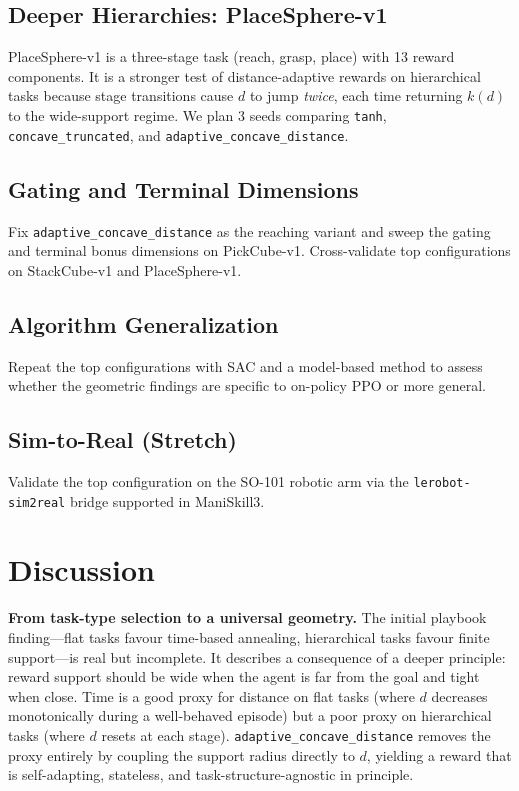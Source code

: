 \documentclass{article}
\begin{document}
\subsection{Deeper Hierarchies: PlaceSphere-v1}

PlaceSphere-v1 is a three-stage task (reach, grasp, place) with 13 reward components.
It is a stronger test of distance-adaptive rewards on hierarchical tasks because stage
transitions cause $d$ to jump \emph{twice}, each time returning $k(d)$ to the
wide-support regime. We plan 3 seeds comparing \texttt{tanh}, \texttt{concave\_truncated},
and \texttt{adaptive\_concave\_distance}.

\subsection{Gating and Terminal Dimensions}

Fix \texttt{adaptive\_concave\_distance} as the reaching variant and sweep the gating
and terminal bonus dimensions on PickCube-v1. Cross-validate top configurations on
StackCube-v1 and PlaceSphere-v1.

\subsection{Algorithm Generalization}

Repeat the top configurations with SAC and a model-based method to assess whether
the geometric findings are specific to on-policy PPO or more general.

\subsection{Sim-to-Real (Stretch)}

Validate the top configuration on the SO-101 robotic arm via the
\texttt{lerobot-sim2real} bridge supported in ManiSkill3.

\section{Discussion}
\label{sec:discussion}

\textbf{From task-type selection to a universal geometry.}
The initial playbook finding---flat tasks favour time-based annealing, hierarchical
tasks favour finite support---is real but incomplete. It describes a consequence of
a deeper principle: reward support should be wide when the agent is far from the goal
and tight when close. Time is a good proxy for distance on flat tasks (where $d$
decreases monotonically during a well-behaved episode) but a poor proxy on hierarchical
tasks (where $d$ resets at each stage). \texttt{adaptive\_concave\_distance} removes
the proxy entirely by coupling the support radius directly to $d$, yielding a reward
that is self-adapting, stateless, and task-structure-agnostic in principle.
\end{document}
